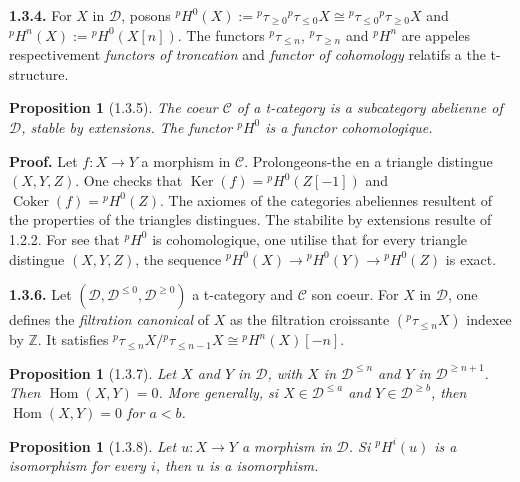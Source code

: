 \documentclass[12pt,a4paper]{article}
\theoremstyle{plain}
\newtheorem{proposition}[theorem]{Proposition}
\theoremstyle{definition}
\theoremstyle{remark}
\DeclareMathOperator{\Hom}{Hom}
\DeclareMathOperator{\Ker}{Ker}
\DeclareMathOperator{\Coker}{Coker}
\newcommand{\ZZ}{\mathbb{Z}}
\newcommand{\cC}{\mathcal{C}}
\newcommand{\cD}{\mathcal{D}}
\begin{document}
\smallskip

\noindent
\textbf{1.3.4.} For $X$ in $\cD$, posons ${}^{p}H^{0}(X) := {}^{p}\tau_{\geq 0}{}^{p}\tau_{\leq 0}X \cong {}^{p}\tau_{\leq 0}{}^{p}\tau_{\geq 0}X$ and ${}^{p}H^{n}(X) := {}^{p}H^{0}(X[n])$. The functors ${}^{p}\tau_{\leq n}$, ${}^{p}\tau_{\geq n}$ and ${}^{p}H^{n}$ are appeles respectivement \emph{functors of troncation} and \emph{functor of cohomology} relatifs a the t-structure.

\smallskip

\begin{proposition}[1.3.5]
The coeur $\cC$ of a t-category is a subcategory abelienne of $\cD$, stable by extensions. The functor ${}^{p}H^{0}$ is a functor cohomologique.
\end{proposition}

\smallskip

\noindent
\textbf{Proof.} Let $f : X \to Y$ a morphism in $\cC$. Prolongeons-the en a triangle distingue $(X, Y, Z)$. One checks that $\Ker(f) = {}^{p}H^{0}(Z[-1])$ and $\Coker(f) = {}^{p}H^{0}(Z)$. The axiomes of the categories abeliennes resultent of the properties of the triangles distingues. The stabilite by extensions resulte of 1.2.2. For see that ${}^{p}H^{0}$ is cohomologique, one utilise that for every triangle distingue $(X, Y, Z)$, the sequence ${}^{p}H^{0}(X) \to {}^{p}H^{0}(Y) \to {}^{p}H^{0}(Z)$ is exact.

\smallskip

\noindent
\textbf{1.3.6.} Let $(\cD, \cD^{\leq 0}, \cD^{\geq 0})$ a t-category and $\cC$ son coeur. For $X$ in $\cD$, one defines the \emph{filtration canonical} of $X$ as the filtration croissante $({}^{p}\tau_{\leq n}X)$ indexee by $\ZZ$. It satisfies ${}^{p}\tau_{\leq n}X / {}^{p}\tau_{\leq n-1}X \cong {}^{p}H^{n}(X)[-n]$.

\smallskip

\begin{proposition}[1.3.7]
Let $X$ and $Y$ in $\cD$, with $X$ in $\cD^{\leq n}$ and $Y$ in $\cD^{\geq n+1}$. Then $\Hom(X, Y) = 0$. More generally, si $X \in \cD^{\leq a}$ and $Y \in \cD^{\geq b}$, then $\Hom(X, Y) = 0$ for $a < b$.
\end{proposition}

\smallskip

\begin{proposition}[1.3.8]
Let $u : X \to Y$ a morphism in $\cD$. Si ${}^{p}H^{i}(u)$ is a isomorphism for every $i$, then $u$ is a isomorphism.
\end{proposition}
\end{document}
